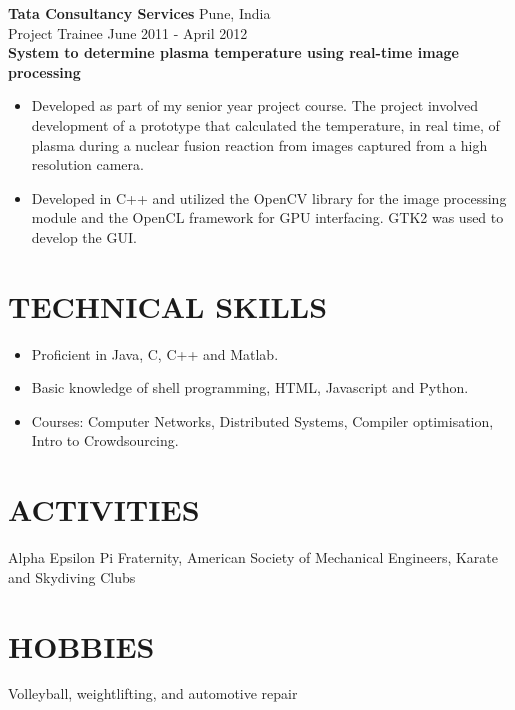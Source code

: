 \documentclass[11pt]{res} %
\begin{document}
\begin{resume}
\noindent \textbf{Tata Consultancy Services} \hfill \hfill Pune, India\\
\noindent Project Trainee \hfill \hfill June 2011 - April 2012 \\
\textbf{System to determine plasma temperature using real-time image processing}
\begin{itemize}
\item Developed as part of my senior year project course. The project involved development of a prototype that calculated the
temperature, in real time, of plasma during a nuclear fusion reaction from images captured from a high resolution camera.
\item Developed in C++ and utilized the OpenCV library for the image processing module and the OpenCL framework for GPU
interfacing. GTK2 was used to develop the GUI.
\end{itemize}

\section{TECHNICAL SKILLS} 
\begin{itemize} 
\item Proficient in Java, C, C++ and Matlab.
\item Basic knowledge of shell programming, HTML, Javascript and Python.
\item Courses: Computer Networks, Distributed Systems, Compiler optimisation, Intro to Crowdsourcing.
\end{itemize}
\section{ACTIVITIES} 
 
Alpha Epsilon  Pi  Fraternity,  American  Society  of  Mechanical 
Engineers, Karate and Skydiving Clubs 
 
\section{HOBBIES} 
 
Volleyball, weightlifting, and automotive repair 
 

\end{resume}
\end{document}
